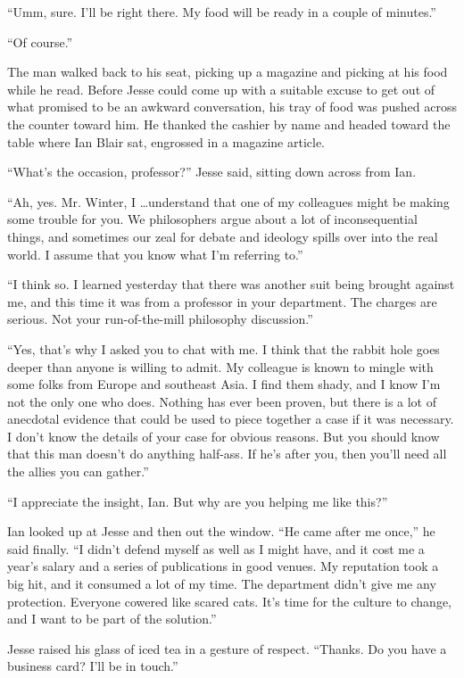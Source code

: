 \documentclass[12pt]{book}
\begin{document}
``Umm, sure.  I'll be right there.  My food will be ready in a couple of minutes.''

``Of course.''

The man walked back to his seat, picking up a magazine and picking at his food while he read.  Before Jesse could come up with a suitable excuse to get out of what promised to be an awkward conversation, his tray of food was pushed across the counter toward him.  He thanked the cashier by name and headed toward the table where Ian Blair sat, engrossed in a magazine article.

``What's the occasion, professor?'' Jesse said, sitting down across from Ian.

``Ah, yes.  Mr. Winter, I \dots understand that one of my colleagues might be making some trouble for you.  We philosophers argue about a lot of inconsequential things, and sometimes our zeal for debate and ideology spills over into the real world.  I assume that you know what I'm referring to.''

``I think so.  I learned yesterday that there was another suit being brought against me, and this time it was from a professor in your department.  The charges are serious.  Not your run-of-the-mill philosophy discussion.''

``Yes, that's why I asked you to chat with me.  I think that the rabbit hole goes deeper than anyone is willing to admit.  My colleague is known to mingle with some folks from Europe and southeast Asia.  I find them shady, and I know I'm not the only one who does.  Nothing has ever been proven, but there is a lot of anecdotal evidence that could be used to piece together a case if it was necessary.  I don't know the details of your case for obvious reasons.  But you should know that this man doesn't do anything half-ass.  If he's after you, then you'll need all the allies you can gather.''

``I appreciate the insight, Ian.  But why are you helping me like this?''

Ian looked up at Jesse and then out the window.  ``He came after me once,'' he said finally.  ``I didn't defend myself as well as I might have, and it cost me a year's salary and a series of publications in good venues.  My reputation took a big hit, and it consumed a lot of my time.  The department didn't give me any protection.  Everyone cowered like scared cats.  It's time for the culture to change, and I want to be part of the solution.''

Jesse raised his glass of iced tea in a gesture of respect.  ``Thanks.  Do you have a business card?  I'll be in touch.''
\end{document}
